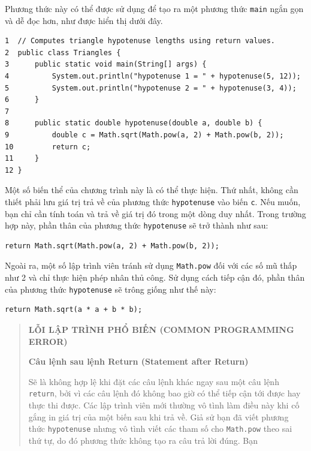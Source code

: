 Phương thức này có thể được sử dụng để tạo ra một phương thức
\texttt{main} ngắn gọn và dễ đọc hơn, như được hiển thị dưới đây.

\begin{verbatim}
1  // Computes triangle hypotenuse lengths using return values. 
2  public class Triangles { 
3      public static void main(String[] args) { 
4          System.out.println("hypotenuse 1 = " + hypotenuse(5, 12)); 
5          System.out.println("hypotenuse 2 = " + hypotenuse(3, 4)); 
6      } 
7 
8      public static double hypotenuse(double a, double b) { 
9          double c = Math.sqrt(Math.pow(a, 2) + Math.pow(b, 2)); 
10         return c; 
11     } 
12 }
\end{verbatim}

Một số biến thể của chương trình này là có thể thực hiện. Thứ nhất,
không cần thiết phải lưu giá trị trả về của phương thức
\texttt{hypotenuse} vào biến \texttt{c}. Nếu muốn, bạn chỉ cần tính toán
và trả về giá trị đó trong một dòng duy nhất. Trong trường hợp này, phần
thân của phương thức \texttt{hypotenuse} sẽ trở thành như sau:

\begin{verbatim}
return Math.sqrt(Math.pow(a, 2) + Math.pow(b, 2));
\end{verbatim}

Ngoài ra, một số lập trình viên tránh sử dụng \texttt{Math.pow} đối với
các số mũ thấp như 2 và chỉ thực hiện phép nhân thủ công. Sử dụng cách
tiếp cận đó, phần thân của phương thức \texttt{hypotenuse} sẽ trông
giống như thế này:

\begin{verbatim}
return Math.sqrt(a * a + b * b);
\end{verbatim}

\begin{quote}
\textbf{LỖI LẬP TRÌNH PHỔ BIẾN (COMMON PROGRAMMING ERROR)}

\textbf{Câu lệnh sau lệnh Return (Statement after Return)}

Sẽ là không hợp lệ khi đặt các câu lệnh khác ngay sau một câu lệnh
\texttt{return}, bởi vì các câu lệnh đó không bao giờ có thể tiếp cận
tới được hay thực thi được. Các lập trình viên mới thường vô tình làm
điều này khi cố gắng in giá trị của một biến sau khi trả về. Giả sử bạn
đã viết phương thức \texttt{hypotenuse} nhưng vô tình viết các tham số
cho \texttt{Math.pow} theo sai thứ tự, do đó phương thức không tạo ra
câu trả lời đúng. Bạn
\end{quote}

